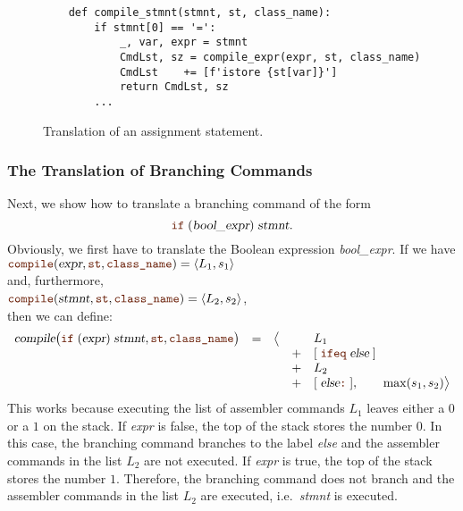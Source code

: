\begin{figure}[!ht]
\centering
\begin{verbatim}
    def compile_stmnt(stmnt, st, class_name):
        if stmnt[0] == '=':
            _, var, expr = stmnt
            CmdLst, sz = compile_expr(expr, st, class_name)
            CmdLst    += [f'istore {st[var]}']
            return CmdLst, sz                
        ...
\end{verbatim}
\vspace*{-0.3cm}
\caption{Translation of an assignment statement.}
\label{fig:Compiler.ipynb:compile:assign}
\end{figure}




\subsubsection{The Translation of Branching Commands}
Next, we show how to translate a branching command of the form
\[ \mytt{if}\; (\textsl{bool\_expr})\; \textsl{stmnt}. \]
Obviously, we first have to translate the Boolean expression \textsl{bool\_expr}.
If we have
\\[0.2cm]
\hspace*{1.3cm}
$\mytt{compile}(\textsl{expr}, \mytt{st}, \mytt{class\_name}) = \pair(L_1, s_1)$
\\[0.2cm]
and, furthermore, 
\\[0.2cm]
\hspace*{1.3cm}
$\mytt{compile}(\textsl{stmnt}, \mytt{st}, \mytt{class\_name}) = \pair(L_2, s_2)$,
\\[0.2cm]
then we can define:
\[
   \begin{array}[t]{lcccl}
   \textsl{compile}\bigl(\mytt{if}\; (\textsl{expr})\;\textsl{stmnt}, \mytt{st}, \mytt{class\_name}\bigr) & = & \bigl\langle & & L_1  \\
   &&& + & [\;\mytt{ifeq}\;\textsl{else}\;] \\
   &&& + & L_2 \\
   &&& + & [\;\textsl{else}\mytt{:}\;], \qquad \max(s_1, s_2) \bigr\rangle        
\end{array}
\]
This works because executing the list of assembler commands $L_1$ leaves either a $0$ or a $1$ on the stack.
If \textsl{expr} is false, the top of the stack stores the number $0$.  In this case, the branching command
 branches to the label \textsl{else} and the assembler commands in the list $L_2$ are not
executed.  If \textsl{expr} is true, the top of the stack stores the number $1$.  Therefore, the branching
command  does not branch and the assembler commands in the list $L_2$ are executed,
i.e.~\textsl{stmnt} is executed.

